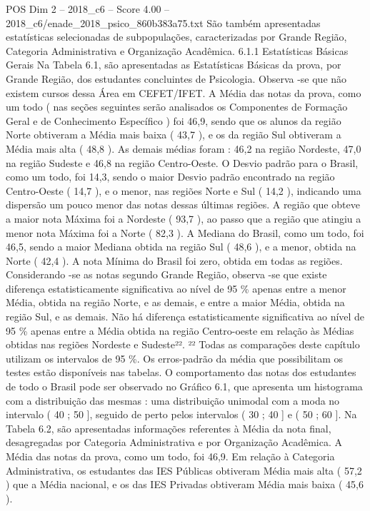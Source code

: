 \begin{textsample}{POS Dim 2 – 2018\_c6 – Score 4.00 – 2018\_c6/enade\_2018\_psico\_860b383a75.txt}
São também apresentadas estatísticas selecionadas de subpopulações, caracterizadas por Grande Região, Categoria Administrativa e Organização Acadêmica. 6.1.1 Estatísticas Básicas Gerais Na Tabela 6.1, são apresentadas as Estatísticas Básicas da prova, por Grande Região, dos estudantes concluintes de Psicologia.
Observa -se que não existem cursos dessa Área em CEFET/IFET.
A Média das notas da prova, como um todo ( nas seções seguintes serão analisados os Componentes de Formação Geral e de Conhecimento Específico ) foi 46,9, sendo que os alunos da região Norte obtiveram a Média mais baixa ( 43,7 ), e os da região Sul obtiveram a Média mais alta ( 48,8 ).
As demais médias foram : 46,2 na região Nordeste, 47,0 na região Sudeste e 46,8 na região Centro-Oeste.
O Desvio padrão para o Brasil, como um todo, foi 14,3, sendo o maior Desvio padrão encontrado na região Centro-Oeste ( 14,7 ), e o menor, nas regiões Norte e Sul ( 14,2 ), indicando uma dispersão um pouco menor das notas dessas últimas regiões.
A região que obteve a maior nota Máxima foi a Nordeste ( 93,7 ), ao passo que a região que atingiu a menor nota Máxima foi a Norte ( 82,3 ).
A Mediana do Brasil, como um todo, foi 46,5, sendo a maior Mediana obtida na região Sul ( 48,6 ), e a menor, obtida na Norte ( 42,4 ).
A nota Mínima do Brasil foi zero, obtida em todas as regiões.
Considerando -se as notas segundo Grande Região, observa -se que existe diferença estatisticamente significativa ao nível de 95 \% apenas entre a menor Média, obtida na região Norte, e as demais, e entre a maior Média, obtida na região Sul, e as demais.
Não há diferença estatisticamente significativa ao nível de 95 \% apenas entre a Média obtida na região Centro-oeste em relação às Médias obtidas nas regiões Nordeste e Sudeste²². ²² Todas as comparações deste capítulo utilizam os intervalos de 95 \%.
Os erros-padrão da média que possibilitam os testes estão disponíveis nas tabelas.
O comportamento das notas dos estudantes de todo o Brasil pode ser observado no Gráfico 6.1, que apresenta um histograma com a distribuição das mesmas : uma distribuição unimodal com a moda no intervalo ( 40 ; 50 ], seguido de perto pelos intervalos ( 30 ; 40 ] e ( 50 ; 60 ].
Na Tabela 6.2, são apresentadas informações referentes à Média da nota final, desagregadas por Categoria Administrativa e por Organização Acadêmica.
A Média das notas da prova, como um todo, foi 46,9.
Em relação à Categoria Administrativa, os estudantes das IES Públicas obtiveram Média mais alta ( 57,2 ) que a Média nacional, e os das IES Privadas obtiveram Média mais baixa ( 45,6 ).

\end{textsample}
